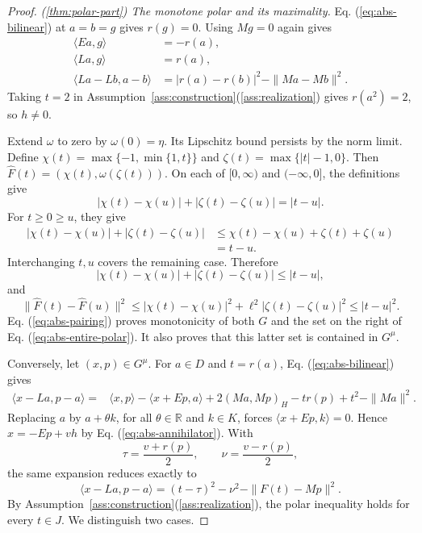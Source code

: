 \documentclass[11pt]{article}
\newcommand{\R}{\mathbb R}
\newcommand{\pair}[2]{\langle #1,#2\rangle}
\theoremstyle{definition}
\theoremstyle{remark}
\begin{document}
\begin{proof}
\noindent\textit{\textup{(\ref{thm:polar-part})} The monotone polar and its maximality.}
Eq. (\ref{eq:abs-bilinear}) at $a=b=g$ gives $r(g)=0$. Using $Mg=0$ again gives
\begin{equation}
\begin{aligned}
\pair{Ea}{g}&=-r(a),\\
\pair{La}{g}&=r(a),\\
\pair{La-Lb}{a-b}&=|r(a)-r(b)|^2-\|Ma-Mb\|^2.
\end{aligned}
\label{eq:abs-pairing}
\end{equation}
Taking $t=2$ in Assumption~\ref{ass:construction}\textup{(\ref{ass:realization})} gives $r(a^2)=2$, so $h\ne0$.

Extend $\omega$ to zero by $\omega(0)=\eta$. Its Lipschitz bound persists by the norm limit. Define $\chi(t)=\max\{-1,\min\{1,t\}\}$ and $\zeta(t)=\max\{|t|-1,0\}$. Then $\widehat F(t)=(\chi(t),\omega(\zeta(t)))$. On each of $[0,\infty)$ and $(-\infty,0]$, the definitions give
\[
|\chi(t)-\chi(u)|+|\zeta(t)-\zeta(u)|=|t-u|.
\]
For $t\ge0\ge u$, they give
\[
\begin{aligned}
|\chi(t)-\chi(u)|+|\zeta(t)-\zeta(u)|
&\le \chi(t)-\chi(u)+\zeta(t)+\zeta(u)\\
&=t-u.
\end{aligned}
\]
Interchanging $t,u$ covers the remaining case. Therefore
\[
|\chi(t)-\chi(u)|+|\zeta(t)-\zeta(u)|\le|t-u|,
\]
and
\[
\|\widehat F(t)-\widehat F(u)\|^2
\le|\chi(t)-\chi(u)|^2+\ell^2|\zeta(t)-\zeta(u)|^2
\le|t-u|^2.
\]
Eq. (\ref{eq:abs-pairing}) proves monotonicity of both $G$ and the set on the right of Eq. (\ref{eq:abs-entire-polar}). It also proves that this latter set is contained in $G^\mu$.

Conversely, let $(x,p)\in G^\mu$. For $a\in D$ and $t=r(a)$, Eq. (\ref{eq:abs-bilinear}) gives
\begin{align*}
\pair{x-La}{p-a}
={}&\pair{x}{p}-\pair{x+Ep}{a}
       +2(Ma,Mp)_H-t r(p)+t^2-\|Ma\|^2.
\end{align*}
Replacing $a$ by $a+\theta k$, for all $\theta\in\R$ and $k\in K$, forces $\pair{x+Ep}{k}=0$. Hence $x=-Ep+v h$ by Eq. (\ref{eq:abs-annihilator}). With
\[
\tau=\frac{v+r(p)}2,\qquad \nu=\frac{v-r(p)}2,
\]
the same expansion reduces exactly to
\begin{equation}
\pair{x-La}{p-a}=(t-\tau)^2-\nu^2-\|F(t)-Mp\|^2.
\label{eq:abs-polar-square}
\end{equation}
By Assumption~\ref{ass:construction}\textup{(\ref{ass:realization})}, the polar inequality holds for every $t\in J$. We distinguish two cases.


\end{proof}
\end{document}
